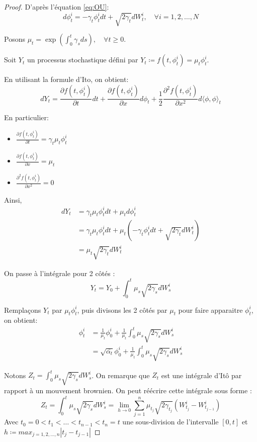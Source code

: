 \documentclass[a4paper,10pt]{article}
\theoremstyle{definition} %
\theoremstyle{definition} %
\theoremstyle{definition} %
\theoremstyle{definition} %
\begin{document}
\begin{proof}
    D'après l'équation \eqref{eq:OU}:
    \[d\phi_t^i = -\gamma_t \phi_t^i dt + \sqrt{2\gamma_t}dW_t^i, \quad \forall i=1,2,\dots,N\] 
    
    Posons $\mu_t = \exp{\left(\int_0^t \gamma_s ds\right)}, \quad \forall t \geq 0$.
    
    Soit $Y_t$ un processus stochastique défini par $Y_t \coloneqq f(t,\phi_t^i)= \mu_t \phi_t^i$.
    
    En utilisant la formule d'Ito, on obtient:
    \[dY_t = \frac{\partial f(t,\phi_t^i)}{\partial t} dt + \frac{\partial f(t,\phi_t^i)}{\partial x} d\phi_t + \frac{1}{2}\frac{\partial^2f(t,\phi_t^i)}{\partial x^2}d\langle\phi,\phi\rangle_t\]

    En particulier:
    \begin{itemize}
        \item $\frac{\partial f(t,\phi_t^i)}{\partial t} = \gamma_t \mu_t \phi_t^i$
        \item $\frac{\partial f(t,\phi_t^i)}{\partial x} = \mu_t$
        \item $\frac{\partial^2f(t,\phi_t^i)}{\partial x^2}=0$
    \end{itemize}

    Ainsi,
    \begin{align*}
        dY_t &= \gamma_t \mu_t \phi_t^i dt + \mu_t d\phi_t^i\\
        &= \gamma_t \mu_t \phi_t^i dt + \mu_t (-\gamma_t \phi_t^i dt + \sqrt{2\gamma_t}dW_t^i)\\
        &= \mu_t\sqrt{2\gamma_t}dW_t^i
    \end{align*}
    
    On passe à l'intégrale pour 2 côtés :
    \[Y_t = Y_0 + \int_0^t \mu_s\sqrt{2\gamma_s}dW_s^i\]

    Remplaçons $Y_t$ par $\mu_t \phi_t^i$, puis divisons les 2 côtés par $\mu_t$ pour faire apparaitre $\phi_t^i$, on obtient:
    \begin{align*}
        \phi_t^i &= \frac{1}{\mu_t}\phi_0^i + \frac{1}{\mu_t} \int_0^t \mu_s\sqrt{2\gamma_s}dW_s^i \\
        &= \sqrt{\bar{\alpha_t}}\phi_0^i + \frac{1}{\mu_t} \int_0^t \mu_s\sqrt{2\gamma_s}dW_s^i
    \end{align*}

    Notons $Z_t = \int_0^t\mu_s\sqrt{2\gamma_s}dW_s^i$. On remarque que $Z_t$ est une intégrale d'Itô par rapport à un mouvement brownien. On peut réécrire cette intégrale sous forme :
    \[Z_t=\int_0^t\mu_s\sqrt{2\gamma_s}dW_s^i = \lim\limits_{h\rightarrow 0} \sum\limits_{j=1}^{n} \mu_{t_j}\sqrt{2\gamma_{t_j}}(W^i_{t_j}-W^i_{t_{j-1}})\]
    Avec $t_0=0 < t_1<\dots<t_{n-1} < t_{n} = t$ une sous-division de l'intervalle $[0,t]$ et $h \coloneqq max_{j = 1,2,\dots,n} |t_j - t_{j-1}|$


\end{proof}
\end{document}
